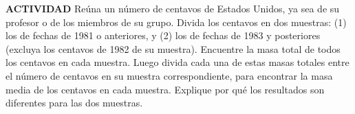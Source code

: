 \item \textbf{ACTIVIDAD} Reúna un número de centavos de Estados Unidos, ya sea de su profesor o de los miembros de su grupo. Divida los centavos en dos muestras: (1) los de fechas de 1981 o anteriores, y (2) los de fechas de 1983 y posteriores (excluya los centavos de 1982 de su muestra). Encuentre la masa total de todos los centavos en cada muestra. Luego divida cada una de estas masas totales entre el número de centavos en su muestra correspondiente, para encontrar la masa media de los centavos en cada muestra. Explique por qué los resultados son diferentes para las dos muestras.
